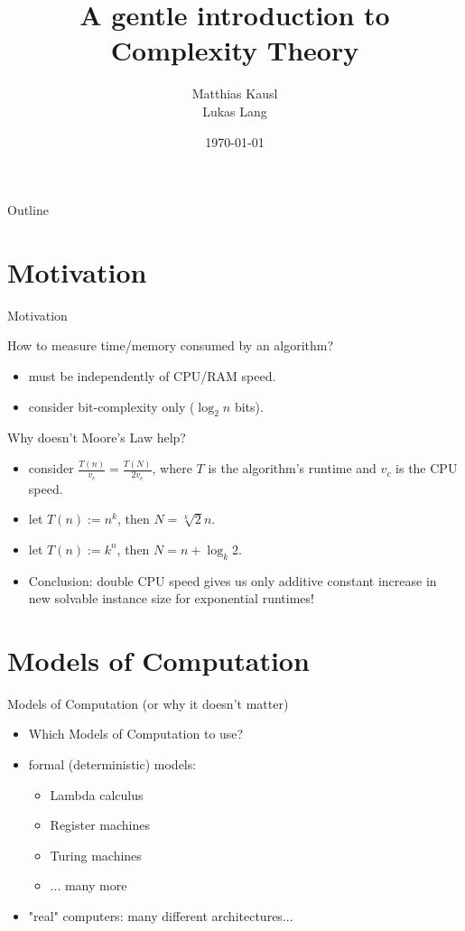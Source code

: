 \documentclass[c]{beamer}
\title{A gentle introduction to Complexity Theory}
\author{Matthias Kausl \\ Lukas Lang}
\institute{Vienna University of Technology}
\date{\today}
\begin{document}
\begin{frame}
\titlepage
\end{frame}

\begin{frame}{Outline}
	\tableofcontents
\end{frame}

\section{Motivation}

\begin{frame}{Motivation}
	\begin{block}{How to measure time/memory consumed by an algorithm?}
		\begin{itemize}
			\item must be independently of CPU/RAM speed.
			\item consider bit-complexity only ($\log_{2} n$ bits).
		\end{itemize}
          \end{block}
	\begin{block}{Why doesn't Moore's Law help?}
		\begin{itemize}
			\item consider $\frac{T(n)}{v_{c}} = \frac{T(N)}{2v_{c}}$, where $T$ is the algorithm's runtime and $v_{c}$ is the CPU speed. 
			\item let $T(n) := n^{k}$, then $N = \sqrt[k]{2}n$.
			\item let $T(n) := k^{n}$, then $N = n + \log_{k} 2$.
			\item Conclusion: double CPU speed gives us only additive constant increase in new solvable instance size for exponential runtimes!
		\end{itemize}
          \end{block}
\end{frame}

\section{Models of Computation}
\begin{frame}{Models of Computation (or why it doesn't matter)}
          \begin{itemize}
			\item Which Models of Computation to use?
			\item formal (deterministic) models:
			\begin{itemize}
				\item Lambda calculus
				\item Register machines
				\item Turing machines
				\item ... many more
			\end{itemize}
			\item "real" computers: many different architectures...
		  \end{itemize}
\end{frame}		
\end{document}
